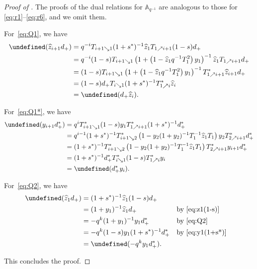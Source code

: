 \documentclass[reqno]{amsart}
\theoremstyle{plain}
\theoremstyle{definition}
\theoremstyle{remark}
\newcommand{\A}{\mathbb{A}}%
\newcommand{\z}{\widehat{z}}
\let\oldTheta\Theta
\let\Theta\undefined
\DeclareMathOperator{\Theta}{\oldTheta}
\newcommand{\<}{\langle}
\renewcommand{\>}{\rangle}
\begin{document}
\begin{proof}[Proof of {}]
    The proofs of the dual relations for $\A_{q^{-1}}$ are analogous to those for \eqref{eq:r1}--\eqref{eq:r6}, and we omit them.

    For~\eqref{eq:Q1}, we have
    \begin{align*}
        \Theta(\z_{i+1} d_+)
        & = q^{-i} T_{i+1 \searrow 1} (1+s^*)^{-1} \z_1 T_{1 \nearrow i+1}  (1-s) d_+ \\
        & = q^{-i} (1-s) T_{i+1 \searrow 1} \left( 1 + \left( 1 - \z_1 q^{-1} T^2_1 \right) y_1 \right)^{-1} \z_1 T_{1 \nearrow i+1} d_+ \\
        & = (1-s) T_{i+1 \searrow 1} \left( 1 + \left( 1 - \z_1 q^{-1} T^2_1 \right) y_1 \right)^{-1}  T_{1 \nearrow i+1}^* \z_{i+1} d_+ \\
        & = (1-s) d_+ T_{i \searrow 1} (1+s^*)^{-1} T_{1 \nearrow i}^* \z_i \\
        & = \Theta(d_+ \z_i).
    \end{align*}
    
    For~\eqref{eq:Q1*}, we have
    \begin{align*}
        \Theta(y_{i+1} d^*_+)
        & = q^{i} T_{i+1 \searrow 1}^* (1-s) y_1 T_{1 \nearrow i+1}^* (1+s^*)^{-1} d^*_+ \\
        & = q^{i-1} (1+s^*)^{-1} T^*_{i+1 \searrow 2} \left( 1 - y_2 (1 + y_2)^{-1} T_1^{-1} \z_1 T_1 \right) y_2 T^*_{2 \nearrow i+1} d^*_+ \\
        & = (1+s^*)^{-1} T^*_{i+1 \searrow 2} \left( 1 - y_2 (1 + y_2)^{-1} T_1^{-1} \z_1 T_1 \right) T^*_{2 \nearrow i+1} y_{i+1} d^*_+ \\
        & = (1+s^*)^{-1} d^*_+ T^*_{i \searrow 1} (1-s) T^*_{1 \nearrow i} y_{i} \\
        & = \Theta(d^*_+ y_i).
    \end{align*}

    For~\eqref{eq:Q2}, we have
    \begin{align*}
        \Theta(\z_1 d_+) & = (1+s^*)^{-1} \z_1 (1-s) d_+ \\
        & = (1 + y_1)^{-1} \z_1 d_+ && \text{by } \eqref{eq:z1(1-s)} \\
        & = -q^k (1 + y_1)^{-1} y_1 d_+^* && \text{by } \eqref{eq:Q2} \\
        & = -q^k (1-s) y_1 (1+s^*)^{-1} d_+^* && \text{by } \eqref{eq:y1(1+s*)} \\
        & = \Theta(-q^k y_1 d_+^*).
    \end{align*}

    This concludes the proof.
\end{proof}
\end{document}
